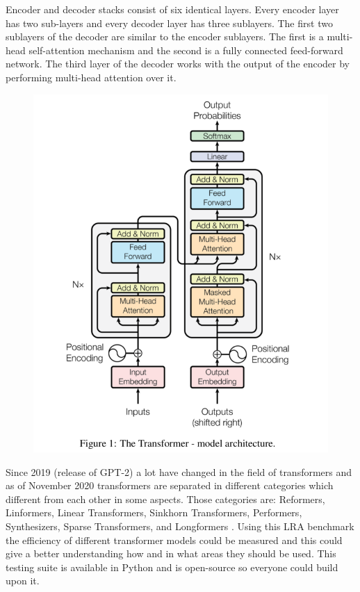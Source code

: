 \documentclass[12pt]{report}
\begin{document}
    Encoder and decoder stacks consist of six identical layers. Every encoder layer has two sub-layers and every decoder layer has three sublayers. The first two sublayers of the decoder are 
    similar to the encoder sublayers. The first is a multi-head self-attention mechanism and the second is a fully connected feed-forward network. The third layer of the decoder works with the output
    of the encoder by performing multi-head attention over it.

    \begin{figure}[htbp]
        \centerline{\includegraphics[scale=.35]{img/transformer_model.png}}
        \label{transformer_model}
    \end{figure}

    Since 2019 (release of GPT-2) a lot have changed in the field of transformers and as of November 2020 transformers are separated in different categories which different from each other in some aspects.
    Those categories are: Reformers, Linformers, Linear Transformers, Sinkhorn Transformers, Performers, Synthesizers, Sparse Transformers, and Longformers \citep{LRA_benchmark}. Using this LRA benchmark the
    efficiency of different transformer models could be measured and this could give a better understanding how and in what areas they should be used. This testing suite is available in Python and is open-source so
    everyone could build upon it.
\end{document}
